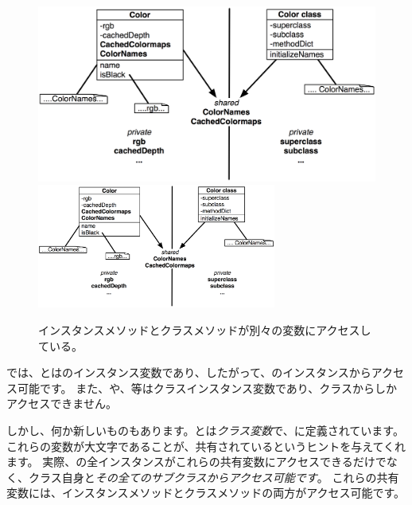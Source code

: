 \documentclass[a4paper,10pt,twoside]{book}
\begin{document}
\begin{figure}[htb]
\begin{center}
\ifluluelse
	{\includegraphics[width=\textwidth]{privateSharedVarColor}}
	{\includegraphics[width=0.7\textwidth]{privateSharedVarColor}}
\caption{インスタンスメソッドとクラスメソッドが別々の変数にアクセスしている。}
\end{center}
\end{figure}

では、とはのインスタンス変数であり、したがって、のインスタンスからアクセス可能です。
また、や、等はクラスインスタンス変数であり、クラスからしかアクセスできません。

しかし、何か新しいものもあります。とは\emph{クラス変数}で、に定義されています。
これらの変数が大文字であることが、共有されているというヒントを与えてくれます。
実際、の全インスタンスがこれらの共有変数にアクセスできるだけでなく、クラス自身と\emph{その全てのサブクラスからアクセス可能です}。
これらの共有変数には、インスタンスメソッドとクラスメソッドの両方がアクセス可能です。

\end{document}
